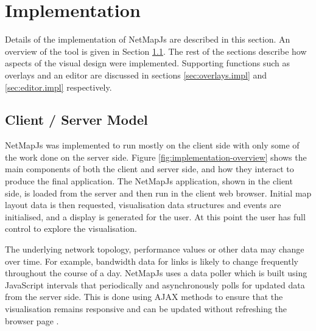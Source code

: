 \documentclass[11pt, a4paper]{report}
\begin{document}
\chapter{Implementation} 
\label{sec:implementation}

Details of the implementation of NetMapJs are described in this section. An
overview of the tool is given in Section \ref{sec:client-server-model.impl}. The
rest of the sections describe how aspects of the visual design were implemented.
Supporting functions such as overlays and an editor are discussed in sections
\ref{sec:overlays.impl} and \ref{sec:editor.impl} respectively.

\section{Client / Server Model}
\label{sec:client-server-model.impl}

NetMapJs was implemented to run mostly on the client side with only some of the
work done on the server side. Figure \ref{fig:implementation-overview} shows the
main components of both the client and server side, and how they interact to
produce the final application. The NetMapJs application, shown in the client
side, is loaded from the server and then run in the client web browser. Initial
map layout data is then requested, visualisation data structures and events are
initialised, and a display is generated for the user. At this point the user has
full control to explore the visualisation.

The underlying network topology, performance values or other data may change
over time. For example, bandwidth data for links is likely to change frequently
throughout the course of a day. NetMapJs uses a data poller which is built using
JavaScript intervals that periodically and asynchronously polls for updated data
from the server side. This is done using AJAX methods to ensure that the
visualisation remains responsive and can be updated without refreshing the
browser page \cite{Paulson_2005}.
\end{document}
